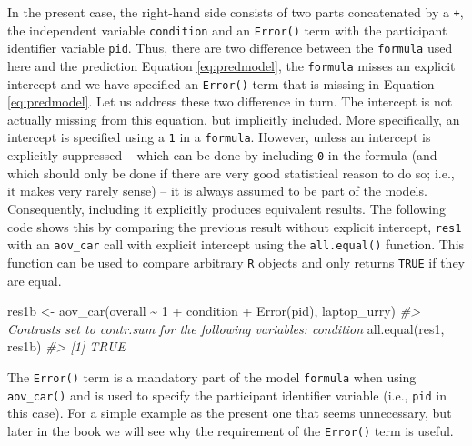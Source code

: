 \documentclass[
]{book}
\newenvironment{Shaded}{\begin{snugshade}}{\end{snugshade}}
\newcommand{\CommentTok}[1]{\textcolor[rgb]{0.56,0.35,0.01}{\textit{#1}}}
\newcommand{\DecValTok}[1]{\textcolor[rgb]{0.00,0.00,0.81}{#1}}
\newcommand{\FunctionTok}[1]{\textcolor[rgb]{0.00,0.00,0.00}{#1}}
\newcommand{\NormalTok}[1]{#1}
\newcommand{\OtherTok}[1]{\textcolor[rgb]{0.56,0.35,0.01}{#1}}
\newcommand{\SpecialCharTok}[1]{\textcolor[rgb]{0.00,0.00,0.00}{#1}}
\begin{document}
In the present case, the right-hand side consists of two parts concatenated by a \texttt{+}, the independent variable \texttt{condition} and an \texttt{Error()} term with the participant identifier variable \texttt{pid}. Thus, there are two difference between the \texttt{formula} used here and the prediction Equation \eqref{eq:predmodel}, the \texttt{formula} misses an explicit intercept and we have specified an \texttt{Error()} term that is missing in Equation \eqref{eq:predmodel}. Let us address these two difference in turn. The intercept is not actually missing from this equation, but implicitly included. More specifically, an intercept is specified using a \texttt{1} in a \texttt{formula}. However, unless an intercept is explicitly suppressed -- which can be done by including \texttt{0} in the formula (and which should only be done if there are very good statistical reason to do so; i.e., it makes very rarely sense) -- it is always assumed to be part of the models. Consequently, including it explicitly produces equivalent results. The following code shows this by comparing the previous result without explicit intercept, \texttt{res1} with an \texttt{aov\_car} call with explicit intercept using the \texttt{all.equal()} function. This function can be used to compare arbitrary \texttt{R} objects and only returns \texttt{TRUE} if they are equal.

\begin{Shaded}
\begin{Highlighting}[]
\NormalTok{res1b }\OtherTok{\textless{}{-}} \FunctionTok{aov\_car}\NormalTok{(overall }\SpecialCharTok{\textasciitilde{}} \DecValTok{1} \SpecialCharTok{+}\NormalTok{ condition }\SpecialCharTok{+} \FunctionTok{Error}\NormalTok{(pid), laptop\_urry)}
\CommentTok{\#\textgreater{} Contrasts set to contr.sum for the following variables: condition}
\FunctionTok{all.equal}\NormalTok{(res1, res1b)}
\CommentTok{\#\textgreater{} [1] TRUE}
\end{Highlighting}
\end{Shaded}

The \texttt{Error()} term is a mandatory part of the model \texttt{formula} when using \texttt{aov\_car()} and is used to specify the participant identifier variable (i.e., \texttt{pid} in this case). For a simple example as the present one that seems unnecessary, but later in the book we will see why the requirement of the \texttt{Error()} term is useful.
\end{document}
